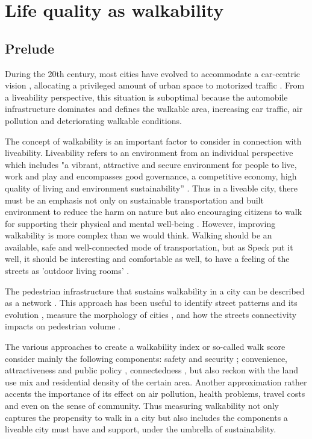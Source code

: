 \chapter{Life quality as walkability}

\section{Prelude}

During the 20th century, most cities have evolved to accommodate a car-centric vision \cite{Jacobs1961}, allocating a privileged amount of urban space to motorized traffic \cite{Gossling2016,Szell2018}. From a liveability perspective, this situation is suboptimal because the automobile infrastructure dominates and defines the walkable area, increasing car traffic, air pollution and deteriorating walkable conditions.

The concept of walkability is an important factor to consider in connection with liveability. Liveability refers to an environment from an individual perspective \cite{Heylen2006} which includes "a vibrant, attractive and secure environment for people to live, work and play and encompasses good governance, a competitive economy, high quality of living and environment sustainability” \cite{Shamsuddin2012}. Thus in a liveable city, there must be an emphasis not only on sustainable transportation and built environment to reduce the harm on nature \cite{Campbell1996,Jabareen2013} but also encouraging citizens to walk for supporting their physical and mental well-being \cite{Frank2006}. However, improving walkability is more complex than we would think. Walking should be an available, safe and well-connected mode of transportation, but as Speck put it well, it should be interesting and comfortable as well, to have a feeling of the streets as ’outdoor living rooms’ \cite{Speck2012}.

The pedestrian infrastructure that sustains walkability in a city can be described as a network \cite{Porta2006}. This approach has been useful to identify street patterns \cite{Barthelemy2008,Louf2014b} and its evolution \cite{Strano2012,Barthelemy2013}, measure the morphology of cities \cite{Boeing2018}, and how the streets connectivity impacts on pedestrian volume \cite{Hajrasouliha2015}.

The various approaches to create a walkability index or so-called walk score consider mainly the following components: safety and security \cite{Quercia2015,Silva2018}; convenience, attractiveness and public policy \cite{Krambeck2006,Speck2012}, connectedness \cite{Southworth2005}, but also reckon with the land use mix and residential density of the certain area\cite{Carr2010}. Another approximation rather accents the importance of its effect on air pollution, health problems, travel costs and even on the sense of community\cite{Stephen2004}. Thus measuring walkability not only captures the propensity to walk in a city but also includes the components a liveable city must have and support, under the umbrella of sustainability.


